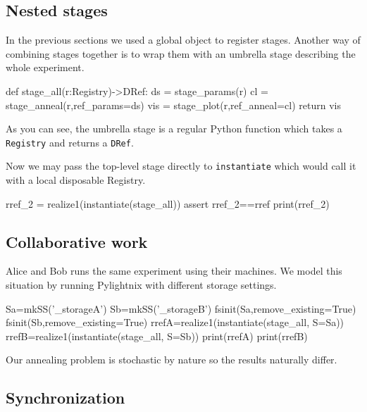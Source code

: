 \mystdout

\subsection{Nested stages}

In the previous sections we used a global
 object to register stages. Another
way of combining stages together is to wrap them with an umbrella stage
describing the whole experiment.

\begin{pythontexcode}
def stage_all(r:Registry)->DRef:
  ds = stage_params(r)
  cl = stage_anneal(r,ref_params=ds)
  vis = stage_plot(r,ref_anneal=cl)
  return vis
\end{pythontexcode}

As you can see, the umbrella stage is a regular Python function which takes a
\texttt{Registry} and returns a \texttt{DRef}.

Now we may pass the top-level stage directly to \texttt{instantiate}
which would call it with a local disposable Registry.

\begin{pythontexcode}
rref_2 = realize1(instantiate(stage_all))
assert rref_2==rref
print(rref_2)
\end{pythontexcode}

\mystdout


\subsection{Collaborative work}

Alice and Bob runs the same experiment using their machines. We model
this situation by running Pylightnix with different storage settings.

\begin{pythontexcode}
Sa=mkSS('_storageA')
Sb=mkSS('_storageB')
fsinit(Sa,remove_existing=True)
fsinit(Sb,remove_existing=True)
rrefA=realize1(instantiate(stage_all, S=Sa))
rrefB=realize1(instantiate(stage_all, S=Sb))
print(rrefA)
print(rrefB)
\end{pythontexcode}

Our annealing problem is stochastic by nature so the results naturally differ.

\subsection{Synchronization}


